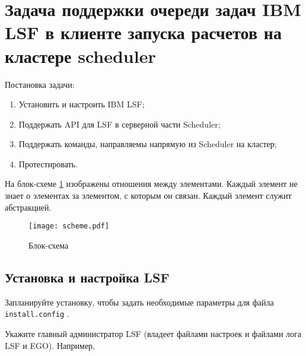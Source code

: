 \section{Задача поддержки очереди задач IBM LSF в клиенте запуска расчетов на кластере scheduler}


Постановка задачи:

\begin{enumerate}
    \item Установить и настроить IBM LSF;
    \item Поддержать API для LSF в серверной части Scheduler;
    \item Поддержать команды, направляемы напрямую из Scheduler на кластер;
    \item Протестировать.
\end{enumerate}

На блок-схеме \ref{fig:block-scheme} изображены отношения между элементами. Каждый элемент не знает о элементах за элементом, с которым он связан. Каждый элемент служит абстракцией.

\begin{figure}[h]
    \centering
    \texttt{[image: scheme.pdf]}
    \caption{Блок-схема}
    \label{fig:block-scheme}
\end{figure}




\subsection{Установка и настройка LSF}


Запланируйте установку, чтобы задать необходимые параметры для файла \lstinline{install.config} \cite{install_plan}.

Укажите главный администратор LSF (владеет файлами настроек и файлами лога LSF и EGO). Например,

